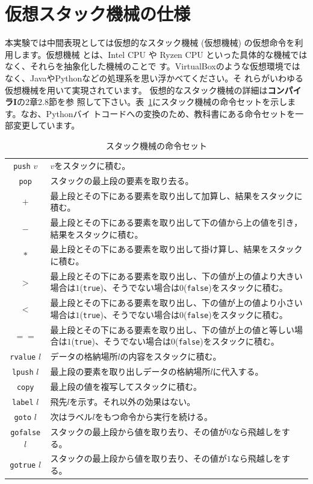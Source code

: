 \documentclass[a4paper,11pt]{jsarticle}
\begin{document}
\section{仮想スタック機械の仕様}
本実験では中間表現としては仮想的なスタック機械 (仮想機械) の仮想命令を利用します。仮想機械
とは、Intel CPU や Ryzen CPU といった具体的な機械ではなく、それらを抽象化した機械のことで
す。VirtualBoxのような仮想環境ではなく、JavaやPythonなどの処理系を思い浮かべてください。そ
れらがいわゆる仮想機械を用いて実現されています。
仮想的なスタック機械の詳細は\textbf{コンパイラI}の2章2.8節を参
照して下さい。表~\ref{stackcommand}にスタック機械の命令セットを示します。なお、Pythonバイ
トコードへの変換のため、教科書にある命令セットを一部変更しています。

\begin{table}[H]
\caption{スタック機械の命令セット} \label{stackcommand}
\centering
\normalsize{
  \begin{tabular}{c|p{}}
    \hline
    \texttt{push} $v$ & $v$をスタックに積む。\\
    \texttt{pop} & スタックの最上段の要素を取り去る。\\
    $+$ & 最上段とその下にある要素を取り出して加算し、結果をスタックに積む。\\
    $-$ & 最上段とその下にある要素を取り出して下の値から上の値を引き，結果をスタックに積む。\\
    $\ast$ & 最上段とその下にある要素を取り出して掛け算し、結果をスタックに積む。\\
    $>$ & 最上段とその下にある要素を取り出し、下の値が上の値より大きい場合は$1$(\texttt{true})、そうでない場合は$0$(\texttt{false})をスタックに積む。\\
    $<$ & 最上段とその下にある要素を取り出し、下の値が上の値より小さい場合は$1$(\texttt{true})、そうでない場合は$0$(\texttt{false})をスタックに積む。\\
    $==$ & 最上段とその下にある要素を取り出し、下の値が上の値と等しい場合は$1$(\texttt{true})、そうでない場合は$0$(\texttt{false})をスタックに積む。\\
    \texttt{rvalue} $l$ & データの格納場所$l$の内容をスタックに積む。\\
    \texttt{lpush} $l$ & 最上段の要素を取り出しデータの格納場所$l$に代入する。\\
    \texttt{copy} & 最上段の値を複写してスタックに積む。\\
    \texttt{label} $l$ & 飛先$l$を示す。それ以外の効果はない。\\
    \texttt{goto} $l$ & 次はラベル$l$をもつ命令から実行を続ける。\\
    \texttt{gofalse} $l$ & スタックの最上段から値を取り去り、その値が$0$なら飛越しをする。\\
    \texttt{gotrue} $l$ & スタックの最上段から値を取り去り、その値が$1$なら飛越しをする。\\
    \hline
  \end{tabular}
}
\end{table}
\end{document}
